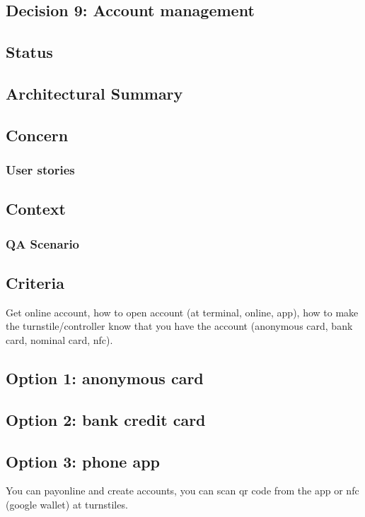 \subsection{Decision 9: Account management}

\subsection*{Status}

\subsection*{Architectural Summary}


\subsection*{Concern}
\subsubsection*{User stories}

\subsection*{Context}
\subsubsection*{QA Scenario} %
\subsection*{Criteria}
\begin{itemize}
\end{itemize}

Get online account, how to open account (at terminal, online, app), how to make the turnstile/controller know that you have the account (anonymous card, bank card, nominal card, nfc).

\subsection*{Option 1: anonymous card}
\subsection*{Option 2: bank credit card}
\subsection*{Option 3: phone app}
You can payonline and create accounts, you can scan qr code from the app or nfc (google wallet) at turnstiles.

